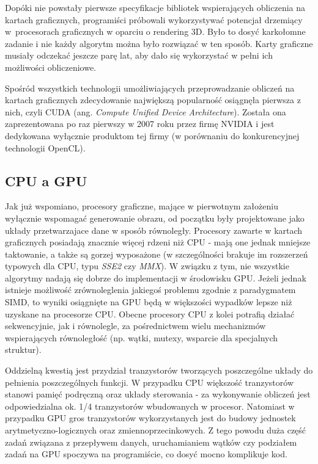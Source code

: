 \documentclass[12pt]{article}
\begin{document}
Dopóki nie powstały pierwsze specyfikacje bibliotek wspierających obliczenia na kartach graficznych, programiści próbowali wykorzystywać potencjał drzemiący w~procesorach graficznych w oparciu o rendering 3D. Było to dosyć karkołomne zadanie i nie każdy algorytm można było rozwiązać w ten sposób. Karty graficzne musiały odczekać jeszcze parę lat, aby dało się wykorzystać w pełni ich możliwości obliczeniowe.

Spośród wszystkich technologii umożliwiających przeprowadzanie obliczeń na kartach graficznych zdecydowanie największą popularność osiągnęła pierwsza z nich, czyli CUDA (ang. \textit{Compute Unified Device Architecture}). Została ona zaprezentowana po raz pierwszy w 2007 roku przez firmę NVIDIA i jest dedykowana wyłącznie produktom tej firmy (w porównaniu do konkurencyjnej technologii OpenCL).

\subsection{CPU a GPU}

Jak już wspomiano, procesory graficzne, mające w pierwotnym założeniu wyłącznie wspomagać generowanie obrazu, od początku były projektowane jako układy przetwarzajace dane w sposób równoległy. Procesory zawarte w kartach graficznych posiadają znacznie więcej rdzeni niż CPU - mają one jednak mniejsze taktowanie, a także są gorzej wyposażone (w szczególności brakuje im rozszerzeń typowych dla CPU, typu \textit{SSE2} czy \textit{MMX}). W związku z tym, nie wszystkie algorytmy nadają się dobrze do implementacji w środowisku GPU. Jeżeli jednak istnieje możliwość zrównoleglenia jakiegoś problemu zgodnie z paradygmatem SIMD, to wyniki osiągnięte na GPU będą w większości wypadków lepsze niż uzyskane na procesorze CPU. Obecne procesory CPU z kolei potrafią działać sekwencyjnie, jak i równolegle, za pośrednictwem wielu mechanizmów wspierających równoległość (np. wątki, mutexy, wsparcie dla specjalnych struktur).

Oddzielną kwestią jest przydział tranzystorów tworzących poszczególne układy do pełnienia poszczególnych funkcji. W przypadku CPU większość tranzystorów stanowi pamięć podręczną oraz układy sterowania - za wykonywanie obliczeń jest odpowiedzialna ok. 1/4 tranzystorów wbudowanych w procesor. Natomiast w przypadku GPU gros tranzystorów wykorzystanych jest do budowy jednostek arytmetyczno-logicznych oraz zmiennoprzecinkowych. Z tego powodu duża część zadań związana z przepływem danych, uruchamianiem wątków czy podziałem zadań na GPU spoczywa na programiście, co dosyć mocno komplikuje kod.
\end{document}
